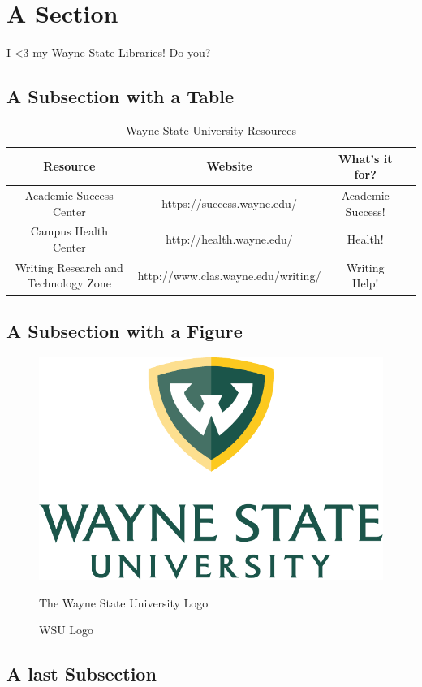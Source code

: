 \section{A Section}   \label{chap:Introduction}

I <3 my Wayne State Libraries! Do you? \cite{WSULibrary}

\subsection{A Subsection with a Table}

\begin{table}[!h]
    \centering	
    \bgroup
    \def\arraystretch{1.00}
    \begin{tabular}{| c | c | c | c |}
          \hline			
          Resource & Website & What's it for? \\ \hline \hline \cline{1-3}
          Academic Success Center & https://success.wayne.edu/ & Academic Success!\\ \hline
          Campus Health Center & http://health.wayne.edu/ & Health! \\ \hline
          Writing Research and Technology Zone & http://www.clas.wayne.edu/writing/ & Writing Help!\\ \hline
    \end{tabular}
    \egroup
    \caption{Wayne State University Resources}
    \label{tab:WSUresources}
\end{table}

\subsection{A Subsection with a Figure}

\begin{figure}[!htbp]
    \centering
    \includegraphics[width=0.25\linewidth]{fig/wsu_primary_stacked_color.pdf}
    \caption{WSU Logo} The Wayne State University Logo
    \label{fig:WSUlogo}
\end{figure}

\subsection{A last Subsection}
